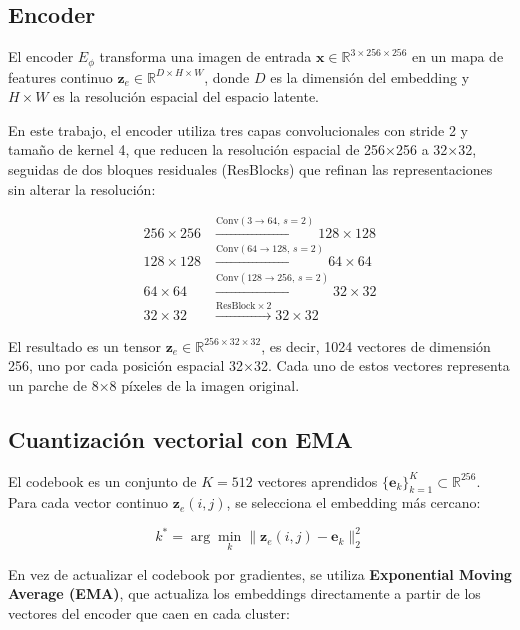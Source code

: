 \subsection{Encoder}

El encoder $E_\phi$ transforma una imagen de entrada $\mathbf{x} \in \mathbb{R}^{3 \times 256 \times 256}$ en un mapa de features continuo $\mathbf{z}_e \in \mathbb{R}^{D \times H \times W}$, donde $D$ es la dimensión del embedding y $H \times W$ es la resolución espacial del espacio latente.

En este trabajo, el encoder utiliza tres capas convolucionales con stride 2 y tamaño de kernel 4, que reducen la resolución espacial de 256×256 a 32×32, seguidas de dos bloques residuales (ResBlocks) que refinan las representaciones sin alterar la resolución:

\begin{align}
256 \times 256 &\xrightarrow{\text{Conv}(3 \to 64,\, s=2)} 128 \times 128 \\
128 \times 128 &\xrightarrow{\text{Conv}(64 \to 128,\, s=2)} 64 \times 64 \\
64 \times 64 &\xrightarrow{\text{Conv}(128 \to 256,\, s=2)} 32 \times 32 \\
32 \times 32 &\xrightarrow{\text{ResBlock} \times 2} 32 \times 32
\end{align}

El resultado es un tensor $\mathbf{z}_e \in \mathbb{R}^{256 \times 32 \times 32}$, es decir, 1024 vectores de dimensión 256, uno por cada posición espacial 32×32. Cada uno de estos vectores representa un parche de 8×8 píxeles de la imagen original.

\subsection{Cuantización vectorial con EMA}

El codebook es un conjunto de $K = 512$ vectores aprendidos $\{\mathbf{e}_k\}_{k=1}^{K} \subset \mathbb{R}^{256}$. Para cada vector continuo $\mathbf{z}_e(i,j)$, se selecciona el embedding más cercano:

\begin{equation}
k^* = \arg\min_k \|\mathbf{z}_e(i,j) - \mathbf{e}_k\|_2^2
\end{equation}

En vez de actualizar el codebook por gradientes, se utiliza \textbf{Exponential Moving Average (EMA)}, que actualiza los embeddings directamente a partir de los vectores del encoder que caen en cada cluster:

